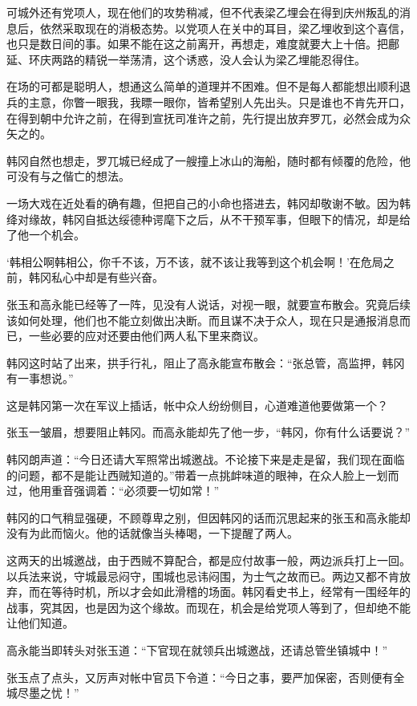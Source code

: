 可城外还有党项人，现在他们的攻势稍减，但不代表梁乙埋会在得到庆州叛乱的消息后，依然采取现在的消极态势。以党项人在关中的耳目，梁乙埋收到这个喜信，也只是数日间的事。如果不能在这之前离开，再想走，难度就要大上十倍。把鄜延、环庆两路的精锐一举荡清，这个诱惑，没人会认为梁乙埋能忍得住。

在场的可都是聪明人，想通这么简单的道理并不困难。但不是每人都能想出顺利退兵的主意，你瞥一眼我，我瞟一眼你，皆希望别人先出头。只是谁也不肯先开口，在得到朝中允许之前，在得到宣抚司准许之前，先行提出放弃罗兀，必然会成为众矢之的。

韩冈自然也想走，罗兀城已经成了一艘撞上冰山的海船，随时都有倾覆的危险，他可没有与之偕亡的想法。

一场大戏在近处看的确有趣，但把自己的小命也搭进去，韩冈却敬谢不敏。因为韩绛对缘故，韩冈自抵达绥德种谔麾下之后，从不干预军事，但眼下的情况，却是给了他一个机会。

‘韩相公啊韩相公，你千不该，万不该，就不该让我等到这个机会啊！’在危局之前，韩冈私心中却是有些兴奋。

张玉和高永能已经等了一阵，见没有人说话，对视一眼，就要宣布散会。究竟后续该如何处理，他们也不能立刻做出决断。而且谋不决于众人，现在只是通报消息而已，一些必要的应对还要由他们两人私下里来商议。

韩冈这时站了出来，拱手行礼，阻止了高永能宣布散会：“张总管，高监押，韩冈有一事想说。”

这是韩冈第一次在军议上插话，帐中众人纷纷侧目，心道难道他要做第一个？

张玉一皱眉，想要阻止韩冈。而高永能却先了他一步，“韩冈，你有什么话要说？”

韩冈朗声道：“今日还请大军照常出城邀战。不论接下来是走是留，我们现在面临的问题，都不是能让西贼知道的。”带着一点挑衅味道的眼神，在众人脸上一划而过，他用重音强调着：“必须要一切如常！”

韩冈的口气稍显强硬，不顾尊卑之别，但因韩冈的话而沉思起来的张玉和高永能却没有为此而恼火。他的话就像当头棒喝，一下提醒了两人。

这两天的出城邀战，由于西贼不算配合，都是应付故事一般，两边派兵打上一回。以兵法来说，守城最忌闷守，围城也忌讳闷围，为士气之故而已。两边又都不肯放弃，而在等待时机，所以才会如此滑稽的场面。韩冈看史书上，经常有一围经年的战事，究其因，也是因为这个缘故。而现在，机会是给党项人等到了，但却绝不能让他们知道。

高永能当即转头对张玉道：“下官现在就领兵出城邀战，还请总管坐镇城中！”

张玉点了点头，又厉声对帐中官员下令道：“今日之事，要严加保密，否则便有全城尽墨之忧！”

